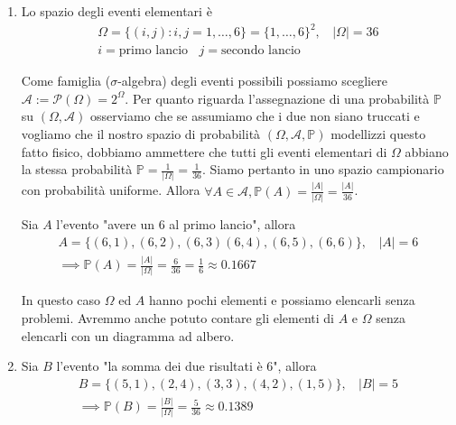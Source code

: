 \Soluzione
\begin{enumerate}
\item Lo spazio degli eventi elementari è\begin{gather*}
\Omega =\{( i,j) :i,j=1,\dots ,6\} =\{1,\dots ,6\}^{2} ,\ \ \ \ | \Omega | =36\\
i=\text{primo lancio} \ \ \ \ j=\text{secondo lancio}
\end{gather*}

Come famiglia ($\sigma $-algebra) degli eventi possibili possiamo scegliere $\mathcal{A} :=\mathcal{P}( \Omega ) =2^{\Omega }$. Per quanto riguarda l'assegnazione di una probabilità $\mathbb{P}$ su $( \Omega ,\mathcal{A})$ osserviamo che se assumiamo che i due non siano truccati e vogliamo che il nostro spazio di probabilità $( \Omega ,\mathcal{A} ,\mathbb{P})$ modellizzi questo fatto fisico, dobbiamo ammettere che tutti gli eventi elementari di $\Omega $ abbiano la stessa probabilità $\mathbb{P} =\frac{1}{| \Omega | } =\frac{1}{36}$. Siamo pertanto in uno spazio campionario con probabilità uniforme. Allora $\forall A\in \mathcal{A} ,\mathbb{P}( A) =\frac{| A| }{| \Omega | } =\frac{| A| }{36}$.

Sia $A$ l'evento "avere un $6$ al primo lancio", allora\begin{gather*}
A=\{( 6,1) ,( 6,2) ,( 6,3)( 6,4) ,( 6,5) ,( 6,6)\} ,\ \ \ \ | A| =6\\
\implies \mathbb{P}( A) =\frac{| A| }{| \Omega | } =\frac{6}{36} =\frac{1}{6} \approx 0.1667
\end{gather*}

\begin{oss}
In questo caso $\Omega $ ed $A$ hanno pochi elementi e possiamo elencarli senza problemi. Avremmo anche potuto contare gli elementi di $A$ e $\Omega $ senza elencarli con un diagramma ad albero.
\end{oss}
\item Sia $B$ l'evento "la somma dei due risultati è $6$", allora\begin{gather*}
B=\{( 5,1) ,( 2,4) ,( 3,3) ,( 4,2) ,( 1,5)\} ,\ \ \ \ | B| =5\\
\implies \mathbb{P}( B) =\frac{| B| }{| \Omega | } =\frac{5}{36} \approx 0.1389
\end{gather*}


\end{enumerate}
